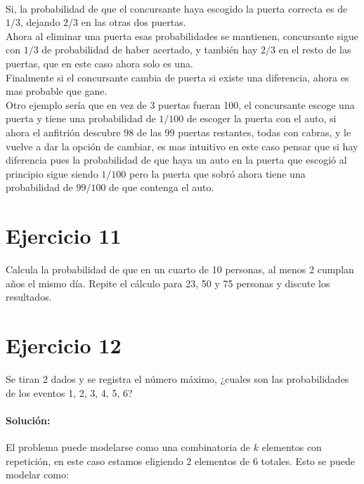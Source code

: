 \documentclass[12pt]{article}
\begin{document}
\paragraph{} Si, la probabilidad de que el concursante haya escogido la puerta correcta es de $1/3$, dejando $2/3$ en las otras dos puertas.\\ Ahora al eliminar una puerta esas probabilidades se mantienen, concursante sigue con $1/3$ de probabilidad de haber acertado, y también hay $2/3$ en el resto de las puertas, que en este caso ahora solo es una.\\
Finalmente si el concursante cambia de puerta si existe una diferencia, ahora es mas probable que gane.\\
Otro ejemplo sería que en vez de 3 puertas fueran 100, el concursante escoge una puerta y tiene una probabilidad de $1/100$ de escoger la puerta con el auto, si ahora el anfitrión descubre 98 de las 99 puertas restantes, todas con cabras, y le vuelve a dar la opción de cambiar, es mas intuitivo en este caso pensar que si hay diferencia pues la probabilidad de que haya un auto en la puerta que escogió al principio sigue siendo $1/100$ pero la puerta que sobró ahora tiene una probabilidad de $99/100$ de que contenga el auto.
\section{Ejercicio 11}
Calcula la probabilidad de que en un cuarto de 10 personas, al menos 2 cumplan años el
mismo día. Repite el cálculo para 23, 50 y 75 personas y discute los resultados.
\section{Ejercicio 12}
Se tiran 2 dados y se registra el número máximo, ¿cuales son las probabilidades de los eventos
1, 2, 3, 4, 5, 6?
\paragraph{Solución: } 
El problema puede modelarse como una combinatoria de $k$ elementos con repetición, en este caso estamos eligiendo 2 elementos de 6 totales. Esto se puede modelar como:
\end{document}
